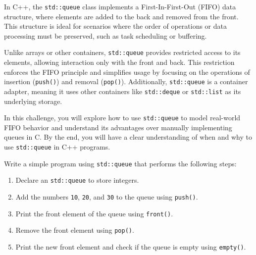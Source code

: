 \begin{challenge}
    \begin{chadescription}
    In C++, the \texttt{std::queue} class implements a First-In-First-Out (FIFO) data structure, where elements are added to the back and removed from the front. 
    This structure is ideal for scenarios where the order of operations or data processing must be preserved, such as task scheduling or buffering.

    Unlike arrays or other containers, \texttt{std::queue} provides restricted access to its elements, allowing interaction only with the front and back. 
    This restriction enforces the FIFO principle and simplifies usage by focusing on the operations of insertion (\texttt{push()}) and removal (\texttt{pop()}). 
    Additionally, \texttt{std::queue} is a container adapter, meaning it uses other containers like \texttt{std::deque} or \texttt{std::list} as its underlying storage.

    In this challenge, you will explore how to use \texttt{std::queue} to model real-world FIFO behavior and understand its advantages over manually implementing queues in C. 
    By the end, you will have a clear understanding of when and why to use \texttt{std::queue} in C++ programs.
    \end{chadescription}

    \begin{task}
        Write a simple program using \texttt{std::queue} that performs the following steps:
        \begin{enumerate}
            \item Declare an \texttt{std::queue} to store integers.
            \item Add the numbers \texttt{10}, \texttt{20}, and \texttt{30} to the queue using \texttt{push()}.
            \item Print the front element of the queue using \texttt{front()}.
            \item Remove the front element using \texttt{pop()}.
            \item Print the new front element and check if the queue is empty using \texttt{empty()}.
        \end{enumerate}


\end{task}
\end{challenge}
